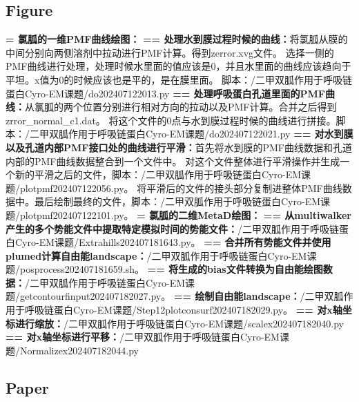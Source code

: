\subsection{Figure}
\noindent \textbf{= 氯胍的一维PMF曲线绘图：}
\newline \textbf{== 处理水到膜过程时候的曲线：}将氯胍从膜的中间分别向两侧溶剂中拉动进行PMF计算。得到zerror.xvg文件。
选择一侧的PMF曲线进行处理，处理时候水里面的值应该是0，并且水里面的曲线应该趋向于平坦。x值为0的时候应该也是平的，是在膜里面。
脚本：/二甲双胍作用于呼吸链蛋白Cyro-EM课题/do202407122013.py
\newline \textbf{== 处理呼吸蛋白孔道里面的PMF曲线：}从氯胍的两个位置分别进行相对方向的拉动以及PMF计算。合并之后得到zrror\_normal\_c1.dat。
将这个文件的0点与水到膜过程时候的曲线进行拼接。脚本：/二甲双胍作用于呼吸链蛋白Cyro-EM课题/do202407122021.py
\newline \textbf{== 对水到膜以及孔道内部PMF接口处的曲线进行平滑：}首先将水到膜的PMF曲线数据和孔道内部的PMF曲线数据整合到一个文件中。
对这个文件整体进行平滑操作并生成一个新的平滑之后的文件，脚本：/二甲双胍作用于呼吸链蛋白Cyro-EM课题/plotpmf202407122056.py。
将平滑后的文件的接头部分复制进整体PMF曲线数据中。最后绘制最终的文件，脚本：/二甲双胍作用于呼吸链蛋白Cyro-EM课题/plotpmf202407122101.py。
\newline \textbf{= 氯胍的二维MetaD绘图：}
\newline \textbf{== 从multiwalker产生的多个势能文件中提取特定模拟时间的势能文件：}/二甲双胍作用于呼吸链蛋白Cyro-EM课题/Extrahills202407181643.py。
\newline \textbf{== 合并所有势能文件并使用plumed计算自由能landscape：}/二甲双胍作用于呼吸链蛋白Cyro-EM课题/posprocess202407181659.sh。
\newline \textbf{== 将生成的bias文件转换为自由能绘图数据：}/二甲双胍作用于呼吸链蛋白Cyro-EM课题/getcontourfinput202407182027.py。
\newline \textbf{== 绘制自由能landscape：}/二甲双胍作用于呼吸链蛋白Cyro-EM课题/Step12plotconsurf202407182029.py。
\newline \textbf{== 对x轴坐标进行缩放：}/二甲双胍作用于呼吸链蛋白Cyro-EM课题/scalex202407182040.py
\newline \textbf{== 对x轴坐标进行平移：}/二甲双胍作用于呼吸链蛋白Cyro-EM课题/Normalizex202407182044.py
\subsection{Paper}
